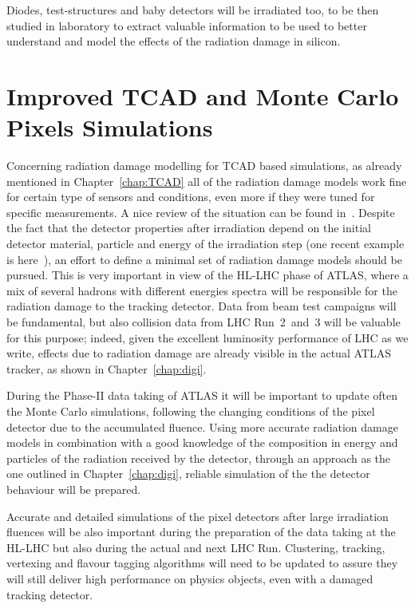 Diodes, test-structures and baby detectors will be irradiated too, to be then studied in laboratory 
to extract valuable information to be used to better understand and model the effects of the radiation 
damage in silicon.

\section{Improved TCAD and Monte Carlo Pixels Simulations}
\label{sec:PerspTCAD}

Concerning radiation damage modelling for TCAD based simulations, as already mentioned in 
Chapter~\ref{chap:TCAD} all of the radiation damage models work fine for certain type of sensors and 
conditions, even more  if they were tuned for specific measurements. 
A nice review of the situation can be found in~\cite{GregorVertex2016}. 
Despite the fact that the detector properties after irradiation depend on the initial detector material, particle  
and energy of the irradiation step (one recent example is here~\cite{Allport2016}), an effort to 
define a minimal set of radiation damage models should be pursued. This is very important in 
view of the HL-LHC phase of ATLAS, where a mix of several hadrons with different 
energies spectra will be responsible for the radiation damage to the tracking detector.
Data from beam test campaigns will be fundamental, but also collision data from LHC Run~2~and~3 
will be valuable for this purpose; indeed, given the excellent luminosity performance of LHC as we write, 
effects due to radiation damage are already visible in the actual ATLAS tracker, as 
shown in Chapter~\ref{chap:digi}.


During the Phase-II  data taking of ATLAS it will be important to update often  the  Monte Carlo 
simulations, following the changing conditions of the pixel detector due to the accumulated fluence. 
Using more accurate radiation damage models in combination with a good knowledge of  the composition in 
energy and particles of the radiation received by the detector, through an approach as the one outlined 
in Chapter~\ref{chap:digi}, reliable simulation of the  the detector behaviour will be prepared.   

Accurate and detailed simulations of the pixel detectors after large irradiation fluences will be 
also important during the preparation of the data taking at the HL-LHC but also during the actual 
and next LHC Run. Clustering, tracking, vertexing and flavour tagging algorithms will need to be updated 
to assure they will still deliver high performance on physics objects, even with a damaged tracking 
detector. 

